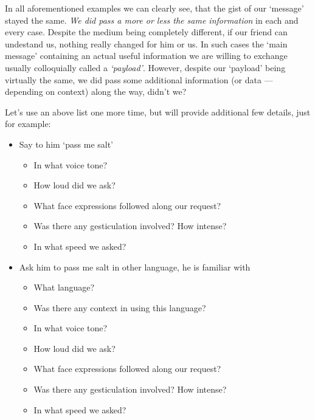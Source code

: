 \documentclass{report}
\begin{document}
            In all aforementioned examples we can clearly see, that the gist of our `message' stayed the same. \emph{We did pass a more or less the same information} in 
            each and every case. Despite the medium being completely different, if our friend can undestand us, nothing really changed for him or us. In such cases
            the `main message' containing an actual useful information we are willing to exchange usually colloquially called a \emph{`payload'}. However,
            despite our `payload' being virtually the same, we did pass some additional information (or data --- depending on context) along the way, didn't we?

            Let's use an above list one more time, but will provide additional few details, just for example:

            \begin{itemize}
                \item Say to him `pass me salt'
                \begin{itemize}
                    \item In what voice tone?
                    \item How loud did we ask?
                    \item What face expressions followed along our request?
                    \item Was there any gesticulation involved? How intense?
                    \item In what speed we asked?
                \end{itemize}

                \item Ask him to pass me salt in other language, he is familiar with
                \begin{itemize}
                    \item What language?
                    \item Was there any context in using this language?
                    \item In what voice tone?
                    \item How loud did we ask?
                    \item What face expressions followed along our request?
                    \item Was there any gesticulation involved? How intense?
                    \item In what speed we asked?
                \end{itemize}


\end{itemize}
\end{document}
